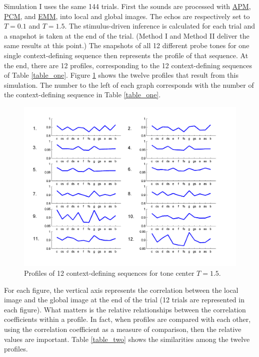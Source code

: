 Simulation I uses the same 144 trials. First the sounds are
processed with \hyperlink{Concepts:AuditoryPeripheralModule}{APM},
\hyperlink{Concepts:PitchCompletionModule}{PCM}, and
\hyperlink{Concepts:EchoicMemoryModule}{EMM}, into local and
global images. The echos are respectively set to $T=0.1$ and
$T=1.5$. The stimulus-driven inference is calculated for each
trial and a snapshot is taken at the end of the trial. (Method I
and Method II deliver the same results at this point.) The
snapshots of all 12 different probe tones for one single
context-defining sequence then represents the profile of that
sequence. At the end, there are 12 profiles, corresponding to the
12 context-defining sequences of Table \ref{table_one}. Figure
\ref{Fig:TonalityDemoFig8} shows the twelve profiles that result from this
simulation. The number to the left of each graph corresponds with
the number of the context-defining sequence in Table
\ref{table_one}.

\begin{figure}[h]
    \centering
    \includegraphics[width=\IPEMDefaultFigureWidth]{Graphics/TonalityDemoFig8}
    \caption{Profiles of 12 context-defining sequences for tone center $T=1.5$.}
    \label{Fig:TonalityDemoFig8}
\end{figure}

For each figure, the vertical axis represents the correlation
between the local image and the global image at the end of the
trial (12 trials are represented in each figure). What matters is
the relative relationships between the correlation coefficients
within a profile. In fact, when profiles are compared with each
other, using the correlation coefficient as a measure of
comparison, then the relative values are important. Table
\ref{table_two} shows the similarities among the twelve profiles.

